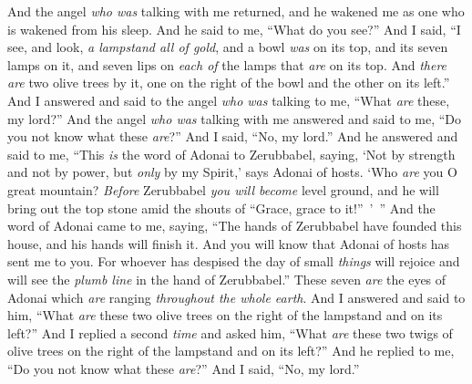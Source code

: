 \begin{biblechapter} %
 And the angel \textit{who was} talking with me returned, and he wakened me as one who is wakened from his sleep.
\verse And he said to me, “What do you see?” And I said, “I see, and look, \textit{a lampstand all of gold}, and a bowl \textit{was} on its top, and its seven lamps on it, and seven lips on \textit{each of} the lamps that \textit{are} on its top.
\verse And \textit{there are} two olive trees by it, one on the right of the bowl and the other on its left.”
\verse And I answered and said to the angel \textit{who was} talking to me, “What \textit{are} these, my lord?”
\verse And the angel \textit{who was} talking with me answered and said to me, “Do you not know what these \textit{are}?” And I said, “No, my lord.”
\verse And he answered and said to me, “This \textit{is} the word of Adonai to Zerubbabel, saying, ‘Not by strength and not by power, but \textit{only} by my Spirit,’ says Adonai of hosts.
\verse ‘Who \textit{are} you O great mountain? \textit{Before} Zerubbabel \textit{you will become} level ground, and he will bring out the top stone amid the shouts of “Grace, grace to it!” ’ ”
\verse And the word of Adonai came to me, saying,
\verse “The hands of Zerubbabel have founded this house, and his hands will finish it. And you will know that Adonai of hosts has sent me to you.
\verse For whoever has despised the day of small \textit{things} will rejoice and will see the \textit{plumb line} in the hand of Zerubbabel.”
\verse These seven \textit{are} the eyes of Adonai which \textit{are} ranging \textit{throughout the whole earth}.
\verse And I answered and said to him, “What \textit{are} these two olive trees on the right of the lampstand and on its left?”
\verse And I replied a second \textit{time} and asked him, “What \textit{are} these two twigs of olive trees on the right of the lampstand and on its left?”
\verse And he replied to me, “Do you not know what these \textit{are}?” And I said, “No, my lord.”
\end{biblechapter}


